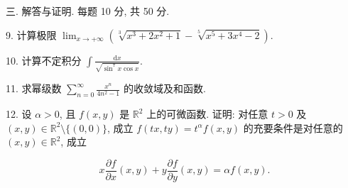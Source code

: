 \documentclass{examcollection}
\renewcommand{\displayformula}[1]{\[#1\]}
\begin{document}
{\begin{minipage}{\textwidth}
三. 解答与证明. 每题 10 分, 共 50 分.\par
9. 计算极限 $\lim_{x\to +\infty}\left(\sqrt[3]{x^3 + 2x^2 + 1} -\sqrt[5]{x^5 + 3x^4 - 2}\right).$\par
10. 计算不定积分 $\int \frac{\mathrm{d}x}{\sqrt{\sin^7 x \cos x}}$.\par
11. 求幂级数 $\sum_{n=0}^{\infty} \frac{x^n}{4n^2 - 1}$ 的收敛域及和函数.\par
12. 设 $\alpha > 0$, 且 $f(x, y)$ 是 $\mathbb{R}^2$ 上的可微函数. 证明: 对任意 $t > 0$ 及 $(x, y) \in \mathbb{R}^2 \setminus \{(0, 0)\}$, 成立 $f(tx, ty) = t^\alpha f(x, y)$ 的充要条件是对任意的 $(x, y) \in \mathbb{R}^2$, 成立\par
\displayformula{x \frac {\partial f}{\partial x} (x, y) + y \frac {\partial f}{\partial y} (x, y) = \alpha f (x, y).}\par
\end{minipage}}
\ifdim\dimexpr\ht\proofbox+\dp\proofbox\relax>\textheight
\noindent\resizebox{!}{\textheight}{\usebox{\proofbox}}\else\noindent\usebox{\proofbox}\fi\clearpage
\end{document}

